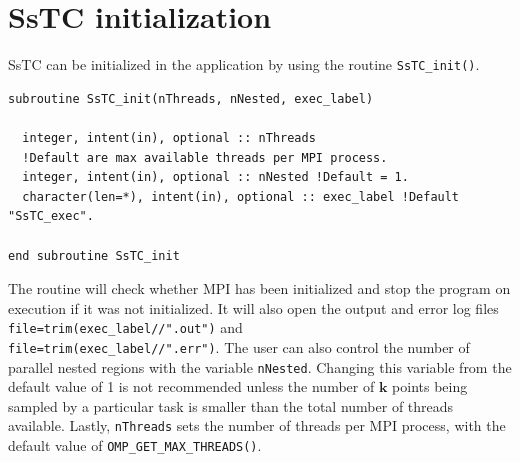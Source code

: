 \documentclass[10pt,a4paper]{article}
\begin{document}
\section{SsTC initialization}
SsTC can be initialized in the application by using the routine \verb|SsTC_init()|. 
\begin{codebox}{}
\begin{lstlisting}[caption={Interface of ``SsTC initialization".},captionpos=b]
subroutine SsTC_init(nThreads, nNested, exec_label)

  integer, intent(in), optional :: nThreads 
  !Default are max available threads per MPI process.
  integer, intent(in), optional :: nNested !Default = 1.
  character(len=*), intent(in), optional :: exec_label !Default "SsTC_exec".
    
end subroutine SsTC_init
\end{lstlisting}
\end{codebox}
The routine will check whether MPI has been initialized and stop the program on execution if it was not initialized. It will also open the output and error log files \verb|file=trim(exec_label//".out")| and \\ \verb|file=trim(exec_label//".err")|. The user can also control the number of parallel nested regions with the variable \verb|nNested|. Changing this variable from the default value of 1 is not recommended unless the number of $\bm{k}$ points being sampled by a particular task is smaller than the total number of threads available. Lastly, \verb|nThreads| sets the number of threads per MPI process, with the default value of \verb|OMP_GET_MAX_THREADS()|.
\end{document}
